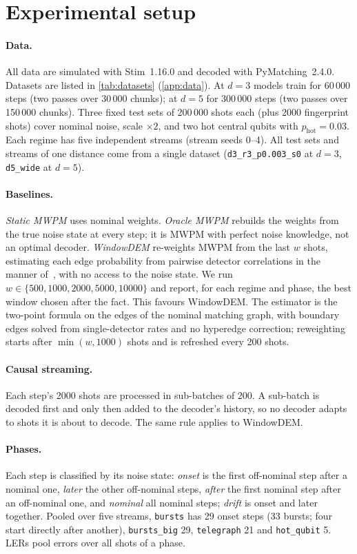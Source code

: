 \documentclass[11pt,a4paper]{article}
\newcommand{\code}[1]{\texttt{#1}}
\newcommand{\reg}[1]{\texttt{#1}}
\begin{document}
\section{Experimental setup}\label{sec:setup}

\paragraph{Data.}
All data are simulated with Stim~1.16.0 and decoded with PyMatching~2.4.0. Datasets are listed in
\cref{tab:datasets} (\cref{app:data}). At $d=3$ models train for 60\,000 steps (two passes over 30\,000 chunks);
at $d=5$ for 300\,000 steps (two passes over 150\,000 chunks). Three fixed test sets of 200\,000 shots each (plus
2000 fingerprint shots) cover nominal noise, scale $\times2$, and two hot central qubits with
$p_{\mathrm{hot}}=0.03$. Each regime has five independent streams (stream seeds 0--4). All test sets and streams of
one distance come from a single dataset (\code{d3\_r3\_p0.003\_s0} at $d=3$, \code{d5\_wide} at $d=5$).

\paragraph{Baselines.}
\emph{Static MWPM} uses nominal weights. \emph{Oracle MWPM} rebuilds the weights from the true noise state at
every step; it is MWPM with perfect noise knowledge, not an optimal decoder. \emph{WindowDEM} re-weights MWPM from
the last $w$ shots, estimating each edge probability from pairwise detector correlations in the manner
of~\cite{spitz2018adaptive}, with no access to the noise state. We run $w\in\{500,1000,2000,5000,10000\}$ and
report, for each regime and phase, the best window chosen after the fact. This favours WindowDEM. The estimator is
the two-point formula on the edges of the nominal matching graph, with boundary edges solved from single-detector
rates and no hyperedge correction; reweighting starts after $\min(w,1000)$ shots and is refreshed every 200 shots.

\paragraph{Causal streaming.}
Each step's 2000 shots are processed in sub-batches of 200. A sub-batch is decoded first and only then added to
the decoder's history, so no decoder adapts to shots it is about to decode. The same rule applies to WindowDEM.

\paragraph{Phases.}
Each step is classified by its noise state: \emph{onset} is the first off-nominal step after a nominal one,
\emph{later} the other off-nominal steps, \emph{after} the first nominal step after an off-nominal one, and
\emph{nominal} all nominal steps; \emph{drift} is onset and later together. Pooled over five streams, \reg{bursts}
has 29 onset steps (33 bursts; four start directly after another), \reg{bursts\_big} 29, \reg{telegraph} 21 and
\reg{hot\_qubit} 5. LERs pool errors over all shots of a phase.
\end{document}
